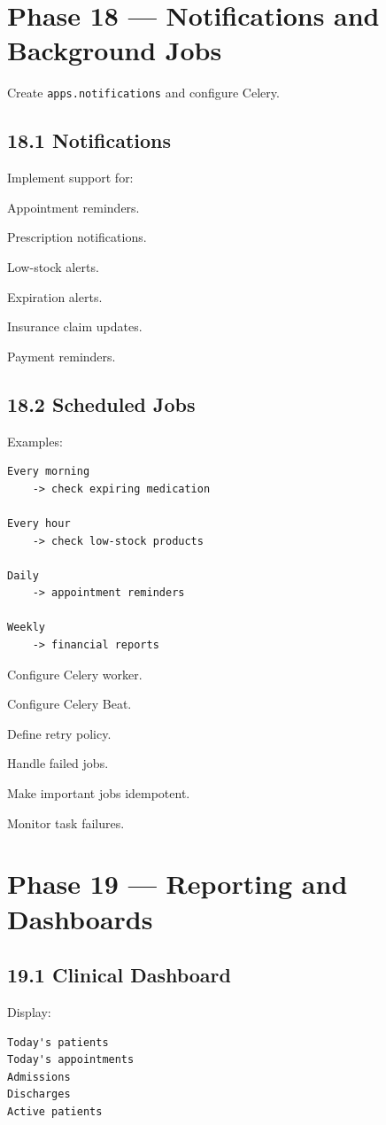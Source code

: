 \documentclass[11pt,a4paper]{article}
\newcommand{\task}[1]{\item[$\square$] #1}
\begin{document}
\section{Phase 18 --- Notifications and Background Jobs}

Create \texttt{apps.notifications} and configure Celery.

\subsection{18.1 Notifications}

Implement support for:

\task{Appointment reminders.}
\task{Prescription notifications.}
\task{Low-stock alerts.}
\task{Expiration alerts.}
\task{Insurance claim updates.}
\task{Payment reminders.}

\subsection{18.2 Scheduled Jobs}

Examples:

\begin{lstlisting}
Every morning
    -> check expiring medication

Every hour
    -> check low-stock products

Daily
    -> appointment reminders

Weekly
    -> financial reports
\end{lstlisting}

\task{Configure Celery worker.}
\task{Configure Celery Beat.}
\task{Define retry policy.}
\task{Handle failed jobs.}
\task{Make important jobs idempotent.}
\task{Monitor task failures.}

\section{Phase 19 --- Reporting and Dashboards}

\subsection{19.1 Clinical Dashboard}

Display:

\begin{lstlisting}
Today's patients
Today's appointments
Admissions
Discharges
Active patients
\end{lstlisting}
\end{document}
